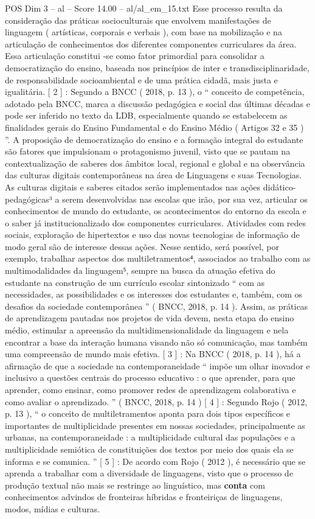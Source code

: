 \begin{textsample}{POS Dim 3 – al – Score 14.00 – al/al\_em\_15.txt}
Esse processo resulta da consideração das práticas socioculturais que envolvem manifestações de linguagem ( artísticas, corporais e verbais ), com base na mobilização e na articulação de conhecimentos dos diferentes componentes curriculares da área.
Essa articulação constitui -se como fator primordial para consolidar a democratização do ensino, baseada nos princípios de inter e transdisciplinaridade, de responsabilidade socioambiental e de uma prática cidadã, mais justa e igualitária. [ 2 ] : Segundo a BNCC ( 2018, p. 13 ), o “ conceito de competência, adotado pela BNCC, marca a discussão pedagógica e social das últimas décadas e pode ser inferido no texto da LDB, especialmente quando se estabelecem as finalidades gerais do Ensino Fundamental e do Ensino Médio ( Artigos 32 e 35 ) ”.
A proposição de democratização do ensino e a formação integral do estudante são fatores que impulsionam o protagonismo juvenil, visto que se pautam na contextualização de saberes dos âmbitos local, regional e global e na observância das culturas digitais contemporâneas na área de Linguagens e suas Tecnologias.
As culturas digitais e saberes citados serão implementados nas ações didático-pedagógicas³ a serem desenvolvidas nas escolas que irão, por sua vez, articular os conhecimentos de mundo do estudante, os acontecimentos do entorno da escola e o saber já institucionalizado dos componentes curriculares.
Atividades com redes sociais, exploração de hipertextos e uso das novas tecnologias de informação de modo geral são de interesse dessas ações.
Nesse sentido, será possível, por exemplo, trabalhar aspectos dos multiletramentos⁴, associados ao trabalho com as multimodalidades da linguagem⁵, sempre na busca da atuação efetiva do estudante na construção de um currículo escolar sintonizado “ com as necessidades, as possibilidades e os interesses dos estudantes e, também, com os desafios da sociedade contemporânea ” ( BNCC, 2018, p. 14 ).
Assim, as práticas de aprendizagem pautadas nos projetos de vida devem, nesta etapa do ensino médio, estimular a apreensão da multidimensionalidade da linguagem e nela encontrar a base da interação humana visando não só comunicação, mas também uma compreensão de mundo mais efetiva. [ 3 ] : Na BNCC ( 2018, p. 14 ), há a afirmação de que a sociedade na contemporaneidade “ impõe um olhar inovador e inclusivo a questões centrais do processo educativo : o que aprender, para que aprender, como ensinar, como promover redes de aprendizagem colaborativa e como avaliar o aprendizado. ” ( BNCC, 2018, p. 14 ) [ 4 ] : Segundo Rojo ( 2012, p. 13 ), “ o conceito de multiletramentos aponta para dois tipos específicos e importantes de multiplicidade presentes em nossas sociedades, principalmente as urbanas, na contemporaneidade : a multiplicidade cultural das populações e a multiplicidade semiótica de constituições dos textos por meio dos quais ela se informa e se comunica. ” [ 5 ] : De acordo com Rojo ( 2012 ), é necessário que se aprenda a trabalhar com a diversidade de linguagens, visto que o processo de produção textual não mais se restringe ao linguístico, mas \textbf{conta} com conhecimentos advindos de fronteiras híbridas e fronteiriças de linguagens, modos, mídias e culturas.

\end{textsample}
